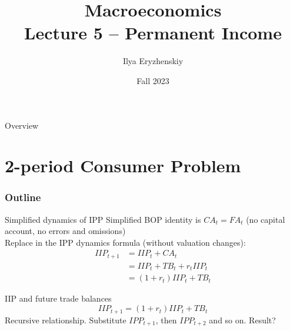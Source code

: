 \documentclass{beamer}
\title[PSME]{Macroeconomics\\ Lecture 5 -- Permanent Income}
\author[I. Eryzhenskiy]{Ilya Eryzhenskiy}
\institute[BdF]{PSME Panth\'{e}on-Sorbonne Master in Economics}
\date[PSME macro]{Fall 2023}
\begin{document}
\begin{frame}
  \maketitle
\end{frame}

\begin{frame}{Overview}
  \tableofcontents
\end{frame}


\section{2-period Consumer Problem}
\begin{frame}
\frametitle{Outline}
\tableofcontents[currentsection]
\end{frame}

  \begin{frame}{Simplified dynamics of IPP}
	Simplified BOP identity is $CA_t = FA_t$ (no capital account, no errors and omissions)\\
	\vfill
	Replace in the IPP dynamics formula (without valuation changes): 
	  \begin{align*}
	  IIP_{t+1} &= IIP_t + CA_t \\
	  			&= IIP_t + TB_t + r_t IIP_t \\
	  &= (1+r_t) IIP_t + TB_t 
	  \end{align*}
  \end{frame}

  \begin{frame}{IIP and future trade balances}
	\vspace{-5cm}
	$$IIP_{t+1} = (1+r_t) IIP_t + TB_t $$
	Recursive relationship. Substitute $IPP_{t+1}$, then $IPP_{t+2}$ and so on. Result?
	

  \end{frame}
\end{document}
